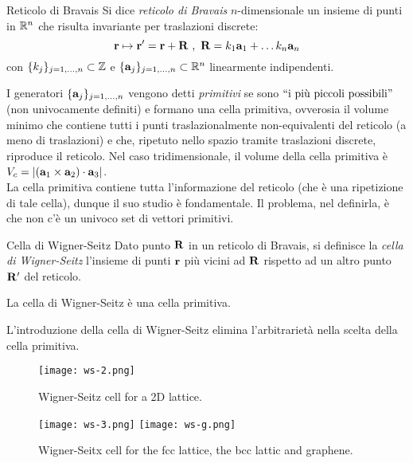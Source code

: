 \begin{definition}{Reticolo di Bravais}{}
	Si dice \textit{reticolo di Bravais} $ n $-dimensionale un insieme di punti in $ \mathbb{R}^n $ che risulta invariante per traslazioni discrete:
	\begin{equation}
		\mathbf{r} \mapsto \mathbf{r}' = \mathbf{r} + \mathbf{R}
		\ , \
		\mathbf{R} = k_1 \mathbf{a}_1 + \dots k_n \mathbf{a}_n
	\end{equation}
	con $ \{k_j\}_{j = 1,\dots,n} \subset \mathbb{Z} $ e $ \{\mathbf{a}_j\}_{j = 1,\dots,n} \subset \mathbb{R}^n $ linearmente indipendenti.
\end{definition}

I generatori $ \{\mathbf{a}_j\}_{j = 1,\dots,n} $ vengono detti \textit{primitivi} se sono $ ``\text{i più piccoli possibili}" $ (non univocamente definiti) e formano una cella primitiva, ovverosia il volume minimo che contiene tutti i punti traslazionalmente non-equivalenti del reticolo (a meno di traslazioni) e che, ripetuto nello spazio tramite traslazioni discrete, riproduce il reticolo. Nel caso tridimensionale, il volume della cella primitiva è $ V_c = \left\lvert(\mathbf{a}_1 \times \mathbf{a}_2) \cdot \mathbf{a}_3\right\rvert $. \\
La cella primitiva contiene tutta l'informazione del reticolo (che è una ripetizione di tale cella), dunque il suo studio è fondamentale. Il problema, nel definirla, è che non c'è un univoco set di vettori primitivi.

\begin{definition}{Cella di Wigner-Seitz}{}
	Dato punto $ \mathbf{R} $ in un reticolo di Bravais, si definisce la \textit{cella di Wigner-Seitz} l'insieme di punti $ \mathbf{r} $ più vicini ad $ \mathbf{R} $ rispetto ad un altro punto $ \mathbf{R}' $ del reticolo.
\end{definition}

\begin{proposition}{}{}
	La cella di Wigner-Seitz è una cella primitiva.
\end{proposition}

L'introduzione della cella di Wigner-Seitz elimina l'arbitrarietà nella scelta della cella primitiva.

\begin{figure}
	\centering
	\texttt{[image: ws-2.png]}
	\caption{Wigner-Seitz cell for a 2D lattice.}
	\label{ws-2}
\end{figure}
\begin{figure}
	\centering
	\texttt{[image: ws-3.png]}
	\quad
	\texttt{[image: ws-g.png]}
	\caption{Wigner-Seitx cell for the fcc lattice, the bcc lattic and graphene.}
	\label{ws-3}
\end{figure}

